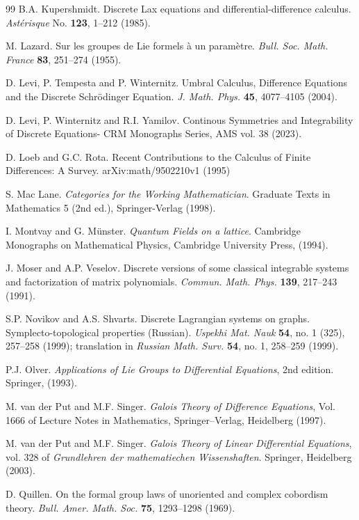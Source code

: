 \documentclass[10pt]{amsart}
\numberwithin{equation}{section}
\theoremstyle{definition}
\begin{document}
\begin{thebibliography}{99}
 B.A. Kupershmidt. Discrete Lax equations and differential-difference calculus. \textit{Ast\'erisque}  No. \textbf{123}, 1--212 (1985).

 M. Lazard. Sur les groupes de Lie formels \`a un param\`etre. \textit{Bull. Soc. Math. France} \textbf{83}, 251--274 (1955).

 D. Levi, P. Tempesta and P. Winternitz. Umbral Calculus, Difference Equations and the Discrete Schr\"{o}dinger Equation. \textit{J. Math. Phys.} \textbf{45}, 4077--4105 (2004).

 D. Levi, P. Winternitz and R.I. Yamilov. Continous Symmetries and Integrability of Discrete Equations- CRM Monographs Series, AMS vol. 38 (2023).

 D. Loeb and G.C. Rota. Recent Contributions to the Calculus of Finite Differences: A Survey. arXiv:math/9502210v1 (1995)

 S. Mac Lane. \textit{Categories for the Working Mathematician}. Graduate Texts in Mathematics 5 (2nd ed.), Springer-Verlag (1998).

 I. Montvay and G. M\"{u}nster. \textit{Quantum Fields on a lattice}. Cambridge Monographs on Mathematical Physics, Cambridge University Press, (1994).

 J. Moser and A.P. Veselov. Discrete versions of some classical integrable systems and factorization of matrix polynomials. \textit{Commun. Math. Phys.} \textbf{139}, 217--243 (1991).

 S.P. Novikov and A.S. Shvarts. Discrete Lagrangian systems on graphs. Symplecto-topological properties (Russian).  \textit{Uspekhi Mat. Nauk}  \textbf{54},  no. 1 (325), 257--258 (1999);  translation in  \textit{Russian Math. Surv.}  \textbf{54},  no. 1, 258--259 (1999).

 P.J. Olver. \textit{Applications of Lie Groups to Differential Equations}, 2nd edition. Springer, (1993).

 M. van der Put and M.F. Singer. \textit{Galois Theory of Difference Equations}, Vol. 1666 of Lecture Notes in Mathematics, Springer--Verlag, Heidelberg (1997).

 M. van der Put and M.F. Singer. \textit{Galois Theory of Linear Differential Equations}, vol. 328 of \textit{Grundlehren der mathematiechen Wissenshaften}. Springer, Heidelberg (2003).

 D. Quillen.  On the formal group laws of unoriented and complex cobordism theory. \textit{Bull. Amer. Math. Soc.} \textbf{75},  1293--1298 (1969).


\end{thebibliography}
\end{document}
